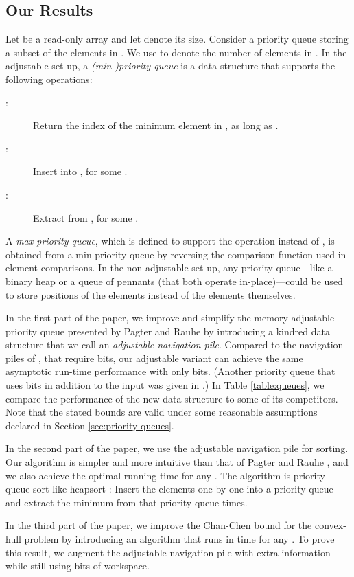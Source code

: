 \documentclass[final,onetabnum,onefignum,onethmnum]{siamltex}
\begin{document}
\subsection{Our Results} 
Let  be a read-only array and let  denote its size.  Consider
a priority queue  storing a subset of the elements in .  We use
 to denote the number of elements in . In the adjustable
set-up, a \emph{(min-)priority queue} is a data structure that
supports the following operations:
\begin{description}
\item[:] Return the index of the minimum element
  in , as long as .
\item[:] Insert   into , for some .
\item[:] Extract  from , for some .
\end{description}
A \emph{max-priority queue}, which is defined to support the operation
 instead of , is obtained from a min-priority
queue by reversing the comparison function used in element
comparisons.
In the non-adjustable set-up, any priority queue---like a binary heap
\cite{Wil64} or a queue of pennants \cite{CMP88} (that both operate
in-place)---could be used to store positions of the elements instead
of the elements themselves.

In the first part of the paper, we improve and simplify the
memory-adjustable priority queue presented by Pagter and Rauhe
\cite{PR98} by introducing a kindred data structure that we call an
\emph{adjustable navigation pile}.  Compared to the navigation piles of
\cite{KV03}, that require  bits, our adjustable variant can
achieve the same asymptotic run-time performance with only 
bits. (Another priority queue that uses  bits in addition
to the input was given in \cite{Elm03}.)  In Table
\ref{table:queues}, we compare the performance of the new data
structure to some of its competitors. Note that the stated bounds are
valid under some reasonable assumptions declared in Section \ref{sec:priority-queues}.

In the second part of the paper, we use the adjustable navigation pile
for sorting.  Our algorithm is simpler and more intuitive than that of
Pagter and Rauhe \cite{PR98}, and we also achieve the optimal
 running time for any .  
The algorithm is priority-queue sort like
heapsort \cite{Wil64}: Insert the  elements one by one into a
priority queue and extract the minimum from that priority queue 
times.

In the third part of the paper, we improve the Chan-Chen bound for the
convex-hull problem by introducing an algorithm that runs in 
 time for any .  To prove this
result, we augment the adjustable navigation pile with extra
information while still using  bits of workspace.
\end{document}
